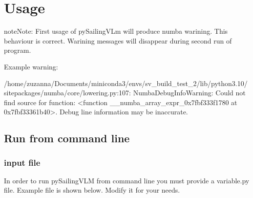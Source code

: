 \documentclass[letterpaper,10pt,english]{jupyterBook}
\begin{document}
\chapter{Usage}
\label{\detokenize{chapters/usage:usage}}\label{\detokenize{chapters/usage::doc}}
\begin{sphinxadmonition}{note}{Note:}
\sphinxAtStartPar
First usage of pySailingVLm will produce numba warining. This behaviour is correct. Warining messages will disappear during second run of program.

\sphinxAtStartPar
Example warning:

\sphinxAtStartPar
/home/zuzanna/Documents/miniconda3/envs/sv\_build\_test\_2/lib/python3.10/site\sphinxhyphen{}packages/numba/core/lowering.py:107: NumbaDebugInfoWarning: Could not find source for function: <function \_\_numba\_array\_expr\_0x7fbf333f1780 at 0x7fbf33361b40>. Debug line information may be inaccurate.
\end{sphinxadmonition}


\section{Run from command line}
\label{\detokenize{chapters/usage:run-from-command-line}}

\subsection{input file}
\label{\detokenize{chapters/usage:input-file}}
\sphinxAtStartPar
In order to run pySailingVLM from command line you must provide a variable.py file. Example file is shown below. Modify it for your needs.
\end{document}
